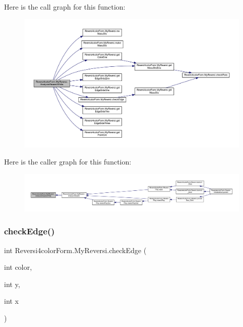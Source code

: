 Here is the call graph for this function\+:
\nopagebreak
\begin{figure}[H]
\begin{center}
\leavevmode
\includegraphics[width=350pt]{class_reversi4color_form_1_1_my_reversi_a61ca891ff78c7357ab077ce7bd3cbf97_cgraph}
\end{center}
\end{figure}
Here is the caller graph for this function\+:
\nopagebreak
\begin{figure}[H]
\begin{center}
\leavevmode
\includegraphics[width=350pt]{class_reversi4color_form_1_1_my_reversi_a61ca891ff78c7357ab077ce7bd3cbf97_icgraph}
\end{center}
\end{figure}
\mbox{\label{class_reversi4color_form_1_1_my_reversi_a8538a52d715eb754c49fc5719390d035}} 
\subsubsection{\texorpdfstring{check\+Edge()}{checkEdge()}}
{\footnotesize\ttfamily int Reversi4color\+Form.\+My\+Reversi.\+check\+Edge (\begin{DoxyParamCaption}\item[{int}]{color,  }\item[{int}]{y,  }\item[{int}]{x }\end{DoxyParamCaption})}




